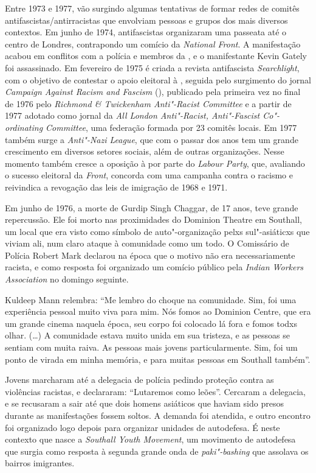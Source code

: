 Entre 1973 e 1977, vão surgindo algumas tentativas de formar redes de comitês antifascistas/antirracistas que envolviam pessoas e grupos dos mais diversos contextos. Em junho de 1974, antifascistas organizaram uma passeata até o centro de Londres, contrapondo um comício da \emph{National Front}. A manifestação acabou em conflitos com a polícia e membros da , e o manifestante Kevin Gately foi assassinado. Em fevereiro de 1975 é criada a revista antifascista \emph{Searchlight}, com o objetivo de contestar o apoio eleitoral à , seguida pelo surgimento do jornal \emph{Campaign Against Racism and Fascism} (), publicado pela primeira vez no final de 1976 pelo \emph{Richmond \& Twickenham Anti"-Racist Committee} e a partir de 1977 adotado como jornal da \emph{All London Anti"-Racist, Anti"-Fascist Co"-ordinating Committee}, uma federação formada por 23 comitês locais. Em 1977 também surge a \emph{Anti"-Nazi League}, que com o passar dos anos tem um grande crescimento em diversos setores sociais, além de outras organizações. Nesse momento também cresce a oposição à  por parte do \emph{Labour Party}, que, avaliando o sucesso eleitoral da \emph{Front}, concorda com uma campanha contra o racismo e reivindica a revogação das leis de imigração de 1968 e 1971.

Em junho de 1976, a morte de Gurdip Singh Chaggar, de 17 anos, teve grande repercussão. Ele foi morto nas proximidades do Dominion Theatre em Southall, um local que era visto como símbolo de auto"-organização pelxs sul"-asiáticxs que viviam ali, num claro ataque à comunidade como um todo. O Comissário de Polícia Robert Mark declarou na época que o motivo não era necessariamente racista, e como resposta foi organizado um comício público pela \emph{Indian Workers Association} no domingo seguinte.

Kuldeep Mann relembra: ``Me lembro do choque na comunidade. Sim, foi uma experiência pessoal muito viva para mim. Nós fomos ao Dominion Centre, que era um grande cinema naquela época, seu corpo foi colocado lá fora e fomos todxs olhar. (\ldots{}) A comunidade estava muito unida em sua tristeza, e as pessoas se sentiam com muita raiva. As pessoas mais jovens particularmente. Sim, foi um ponto de virada em minha memória, e para muitas pessoas em Southall também''.

Jovens marcharam até a delegacia de polícia pedindo proteção contra as violências racistas, e declararam: ``Lutaremos como leões''. Cercaram a delegacia, e se recusaram a sair até que dois homens asiáticos que haviam sido presos durante as manifestações fossem soltos. A demanda foi atendida, e outro encontro foi organizado logo depois para organizar unidades de autodefesa. É neste contexto que nasce a \emph{Southall Youth Movement}, um movimento de autodefesa que surgia como resposta à segunda grande onda de \emph{paki"-bashing} que assolava os bairros imigrantes.

